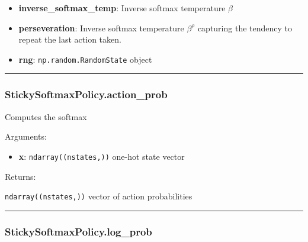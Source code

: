 \begin{itemize}
\tightlist
\item
  \textbf{inverse\_softmax\_temp}: Inverse softmax temperature \(\beta\)
\item
  \textbf{perseveration}: Inverse softmax temperature \(\beta^\rho\)
  capturing the tendency to repeat the last action taken.
\item
  \textbf{rng}: \texttt{np.random.RandomState} object
\end{itemize}

\begin{center}\rule{0.5\linewidth}{\linethickness}\end{center}

\hypertarget{stickysoftmaxpolicy.action_prob}{%
\subsubsection{StickySoftmaxPolicy.action\_prob}\label{stickysoftmaxpolicy.action_prob}}

\begin{Shaded}
\begin{Highlighting}[]
\end{Highlighting}
\end{Shaded}

Computes the softmax

Arguments:

\begin{itemize}
\tightlist
\item
  \textbf{x}: \texttt{ndarray((nstates,))} one-hot state vector
\end{itemize}

Returns:

\texttt{ndarray((nstates,))} vector of action probabilities

\begin{center}\rule{0.5\linewidth}{\linethickness}\end{center}

\hypertarget{stickysoftmaxpolicy.log_prob}{%
\subsubsection{StickySoftmaxPolicy.log\_prob}\label{stickysoftmaxpolicy.log_prob}}

\begin{Shaded}
\begin{Highlighting}[]
\end{Highlighting}
\end{Shaded}

